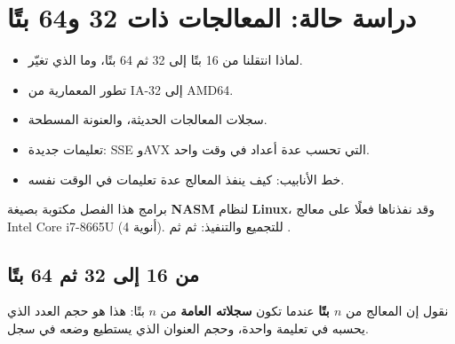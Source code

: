 \chapter{دراسة حالة: المعالجات ذات 32 و64 بتًا}

\begin{khulasa}
\begin{itemize}
    \item لماذا انتقلنا من 16 بتًا إلى 32 ثم 64 بتًا، وما الذي تغيّر.
    \item تطور المعمارية من \textenglish{IA-32} إلى \textenglish{AMD64}.
    \item سجلات المعالجات الحديثة، والعنونة المسطحة.
    \item تعليمات جديدة: \textenglish{SSE} و\textenglish{AVX} التي تحسب عدة أعداد في وقت واحد.
    \item خط الأنابيب: كيف ينفذ المعالج عدة تعليمات في الوقت نفسه.
\end{itemize}
\end{khulasa}

\begin{intabih}
    برامج هذا الفصل مكتوبة بصيغة \textbf{\textenglish{NASM}} لنظام \textbf{\textenglish{Linux}}، وقد نفذناها فعلًا على معالج
    \textenglish{Intel Core i7-8665U} (4 أنوية). للتجميع والتنفيذ:
     ثم  ثم .
\end{intabih}

\section{من 16 إلى 32 ثم 64 بتًا}

\begin{tarif}
    نقول إن المعالج من \textbf{$n$ بتًا} عندما تكون \textbf{سجلاته العامة} من $n$ بتًا: هذا هو حجم العدد الذي
    يحسبه في تعليمة واحدة، وحجم العنوان الذي يستطيع وضعه في سجل.
\end{tarif}


